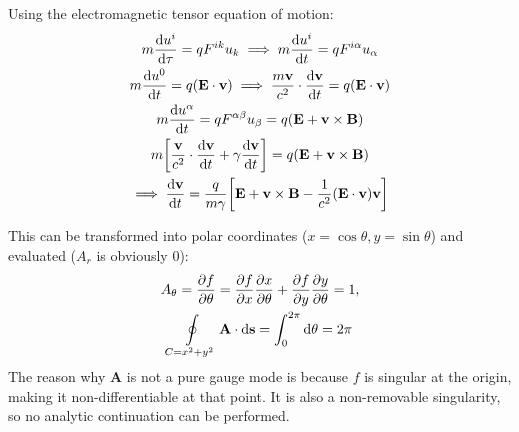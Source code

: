 \documentclass{report}
\theoremstyle{definition}
\begin{document}
\begin{chapter2}
	
\end{chapter2}

\begin{chapter2}
	Using the electromagnetic tensor equation of motion:
	\begin{gather*}
		m\dv{u^i}{\tau} = q F^{ik}u_k \implies m\dv{u^i}{t} = q F^{i\alpha}u_{\alpha} \\
		m\dv{u^0}{t} = q\pqty{\mathbf E \cdot \mathbf v} \implies \frac{m\mathbf v}{c^2}\cdot\dv{\mathbf v}{t} = q\pqty{\mathbf E \cdot \mathbf v} \\
		m\dv{u^{\alpha}}{t} = q F^{\alpha\beta}u_{\beta} = q\pqty{\mathbf E + \mathbf v \times \mathbf B} \\
		m\bqty{\frac{\mathbf v}{c^2}\cdot \dv{\mathbf v}{t} + \gamma \dv{\mathbf v}{t}} = q\pqty{\mathbf E + \mathbf v \times \mathbf B} \\
		\implies \dv{\mathbf v}{t} = \frac{q}{m\gamma}\bqty{\mathbf E + \mathbf v \times \mathbf B - \frac{1}{c^2}\pqty{\mathbf E \cdot \mathbf v}\mathbf v}
	\end{gather*}
\end{chapter2}

\begin{chapter2}
	This can be transformed into polar coordinates ($x = \cos\theta, y = \sin\theta $) and evaluated ($A_r$ is obviously 0):
	\begin{gather*}
		A_{\theta} = \pdv{f}{\theta} = \pdv{f}{x}\pdv{x}{\theta} + \pdv{f}{y}\pdv{y}{\theta} = 1,\\
		\oint\limits_{C = x^2 + y^2} \mathbf A \cdot \dd{\mathbf s} = \int_0^{2\pi}\dd{\theta} = 2\pi 
	\end{gather*}
	The reason why $\mathbf A$ is not a pure gauge mode is because $f$ is singular at the origin, making it non-differentiable at that point. It is also a non-removable singularity, so no analytic continuation can be performed.
\end{chapter2}

\begin{chapter2}
		
\end{chapter2}
\end{document}
